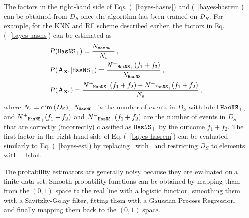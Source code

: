 The factors in the right-hand side of Eqs. (~\ref{bayes-hasns}) and (~\ref{bayes-hasrem}) can be obtained from $D_{S}$ once the algorithm has been trained on $D_{R}$. For example, for the \ac{KNN} and \ac{RF} scheme described earlier, the factors in Eq. (~\ref{bayes-hasns}) can be estimated as  
%
\begin{equation}
\begin{aligned}
&P({{\tt HasNS}}_+)=\frac{N_{{{\tt HasNS}}_+}}{N_s}\,,\nonumber\\
&P({\bf A}_{{\bf X}'}|{{\tt HasNS}}_+)=\frac{N^+{}_{{{\tt HasNS}}_+}(f_1+f_2)}{N_{{{\tt HasNS}}_+}}\,,\nonumber\\
&P({\bf A}_{{\bf X}'})=\frac{N^+{}_{{{\tt HasNS}}_+}(f_1+f_2)+N^-{}_{{{\tt HasNS}}_+}(f_1+f_2)}{N_s}\,,
\label{bayes-est}
\end{aligned}
\end{equation}
%
where $N_s=\hbox{dim}\,(D_S)$, $N_{{{\tt HasNS}}_+}$ is the number of events in $D_S$ with label 
${{\tt HasNS}}_+$, and $N^+{}_{{{\tt HasNS}}_+}(f_1+f_2)$ and $N^-{}_{{{\tt HasNS}}_+}(f_1+f_2)$ are the number of events in $D_S$ that are correctly (incorrectly) classified as ${{{\tt HasNS}}_+}$ by the outcome $f_1+f_2$. The first factor in the right-hand side of Eq. (~\ref{bayes-hasrem}) can be evaluated similarly to Eq. (~\ref{bayes-est}) by replacing \hasns\ with \hasrem\ and restricting $D_S$ to elements with \hasns$_+$ label.

The probability estimators are generally noisy because they are evaluated on a finite data set. Smooth probability functions can be obtained by mapping them from the $(0,1)$ space to the real
line with a logistic function, smoothing them with a Savitzky-Golay filter, fitting them with a Gaussian Process Regression, and finally mapping them back to the $(0,1)$ space.   

